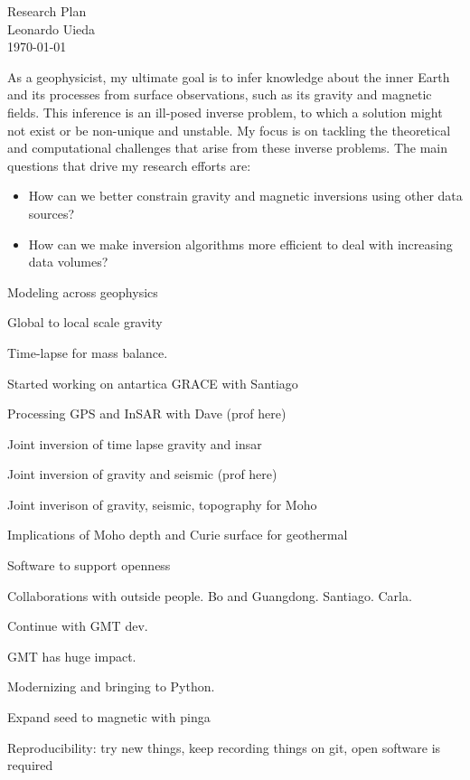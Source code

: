 \documentclass[12pt,notitlepage]{article}
\begin{document}
\begin{center}
    {\huge Research Plan}
    \\[0.2in]
    {Leonardo Uieda}
    \\[0.1in]
    {\small \today}
\end{center}


As a geophysicist, my ultimate goal is to infer knowledge about the inner Earth and its
processes from surface observations, such as its gravity and magnetic fields.
This inference is an ill-posed inverse problem, to which a solution might not exist or
be non-unique and unstable.
My focus is on tackling the theoretical and computational challenges that arise from
these inverse problems.
The main questions that drive my research efforts are:

\begin{itemize}
    \item How can we better constrain gravity and magnetic inversions using other data
        sources?
    \item How can we make inversion algorithms more efficient to deal with increasing
        data volumes?
\end{itemize}



Modeling across geophysics

Global to local scale gravity

Time-lapse for mass balance.

Started working on antartica GRACE with Santiago

Processing GPS and InSAR with Dave (prof here)

Joint inversion of time lapse gravity and insar

Joint inversion of gravity and seismic (prof here)

Joint inverison of gravity, seismic, topography for Moho

Implications of Moho depth and Curie surface for geothermal

Software to support openness

Collaborations with outside people. Bo and Guangdong. Santiago. Carla.

Continue with GMT dev.

GMT has huge impact.

Modernizing and bringing to Python.

Expand seed to magnetic with pinga

Reproducibility: try new things, keep recording things on git, open software is required
\end{document}
